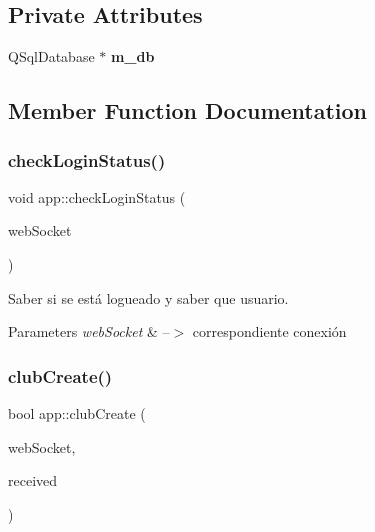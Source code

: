 \subsection*{Private Attributes}
\begin{DoxyCompactItemize}
\item 
\mbox{\label{classapp_a68f450976044452caeb444182c5166ff}} 
Q\+Sql\+Database $\ast$ {\bfseries m\+\_\+db}
\end{DoxyCompactItemize}


\subsection{Member Function Documentation}
\mbox{\label{classapp_a77a1d0cb7a5a4982bcd618a5380e6edf}} 
\subsubsection{\texorpdfstring{check\+Login\+Status()}{checkLoginStatus()}}
{\footnotesize\ttfamily void app\+::check\+Login\+Status (\begin{DoxyParamCaption}\item[{ix\+::\+Web\+Socket $\ast$}]{web\+Socket }\end{DoxyParamCaption})}



Saber si se está logueado y saber que usuario. 


\begin{DoxyParams}{Parameters}
{\em web\+Socket} & --$>$ correspondiente conexión \\
\hline
\end{DoxyParams}
\mbox{\label{classapp_afb7363d3bc58746f8c71425ba6050db1}} 
\subsubsection{\texorpdfstring{club\+Create()}{clubCreate()}}
{\footnotesize\ttfamily bool app\+::club\+Create (\begin{DoxyParamCaption}\item[{ix\+::\+Web\+Socket $\ast$}]{web\+Socket,  }\item[{J\+S\+ON}]{received }\end{DoxyParamCaption})}



